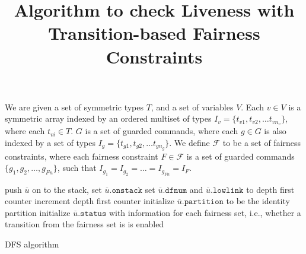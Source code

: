 \documentclass{article}[10pt]
\title{Algorithm to check Liveness with\\Transition-based Fairness Constraints}
\newcommand{\symset}{\ensuremath{T}\xspace}
\newcommand{\varset}{\ensuremath{V}\xspace}
\newcommand{\cmdset}{\ensuremath{G}\xspace}
\newcommand{\fairsetset}{\ensuremath{\mathcal{F}}\xspace}
\begin{document}
\begin{spacing}{1}
\maketitle

We are given a set of symmetric types $\symset$, and a set of
variables $\varset$. Each $v \in \varset$ is a symmetric array indexed
by an ordered multiset of types $I_v = \{t_{v1}, t_{v2}, \ldots
t_{vn_v}\}$, where each $t_{vi} \in \symset$. $\cmdset$ is a set of
guarded commands, where each $g \in \cmdset$ is also indexed by a set
of types $I_g = \{t_{g1}, t_{g2}, \ldots t_{gn_g}\}$. We define
$\fairsetset$ to be a set of fairness constraints, where each fairness
constraint $F \in \fairsetset$ is a set of guarded commands $\{g_1,
g_2, \ldots, g_{Fn}\}$, such that $I_{g_1} = I_{g_2} = \ldots =
I_{g_{Fn}} = I_F$.

\begin{algorithm}
\IncMargin{1em}
\SetAlgoLined
push $\overline{u}$ on to the stack, set $\overline{u}.\mathtt{onstack}$\;
set $\overline{u}.\mathtt{dfnum}$ and $\overline{u}.\mathtt{lowlink}$ to
depth first counter\;
increment depth first counter\;
\BlankLine
initialize $\overline{u}.\mathtt{partition}$ to be the identity partition\;
initialize $\overline{u}.\mathtt{status}$ with information for each
fairness set, i.e., whether a transition from the fairness set is is enabled \;

\caption{DFS algorithm}
\DecMargin{1em}
\end{algorithm}

\end{spacing}
\end{document}
